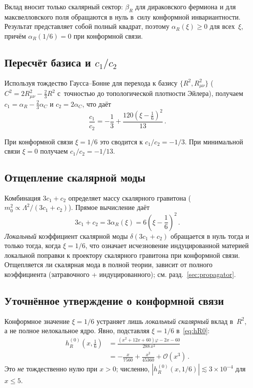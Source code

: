 \documentclass[aps,prd,twocolumn,superscriptaddress,nofootinbib,floatfix]{revtex4-2}
\theoremstyle{definition}
\theoremstyle{remark}
\begin{document}
Вклад вносит только скалярный сектор: $\beta_R$ для дираковского фермиона
и для максвелловского поля обращаются в нуль в~силу конформной инвариантности.
Результат представляет собой полный квадрат, поэтому
$\alpha_R(\xi) \geq 0$ для всех~$\xi$, причём $\alpha_R(1/6) = 0$ при
конформной связи.

\subsection{Пересчёт базиса и \texorpdfstring{$c_1/c_2$}{c1/c2}}

Используя тождество Гаусса--Бонне для перехода к базису
$\{R^2, R_{\mu\nu}^2\}$ ($C^2 = 2R_{\mu\nu}^2 - \frac{2}{3}R^2$
с~точностью до топологической плотности Эйлера), получаем
$c_1 = \alpha_R - \frac{2}{3}\alpha_C$ и $c_2 = 2\alpha_C$, что даёт
\begin{equation}
  \boxed{\frac{c_1}{c_2} = -\frac{1}{3}
    + \frac{120\!\left(\xi - \frac{1}{6}\right)^{\!2}}{13}\,.}
  \label{eq:c1c2}
\end{equation}

При конформной связи $\xi = 1/6$ это сводится к $c_1/c_2 = -1/3$. При
минимальной связи $\xi = 0$ получаем $c_1/c_2 = -1/13$.

\subsection{Отщепление скалярной моды}

Комбинация $3c_1 + c_2$ определяет массу скалярного гравитона
($m_0^2 \propto \Lambda^2/(3c_1 + c_2)$). Прямое вычисление даёт
\begin{equation}
  3c_1 + c_2 = 3\alpha_R(\xi) = 6\!\left(\xi - \frac{1}{6}\right)^{\!2}\,.
  \label{eq:3c1c2}
\end{equation}
\emph{Локальный} коэффициент скалярной моды $\delta(3c_1 + c_2)$
обращается в нуль тогда и только тогда, когда $\xi = 1/6$, что означает
исчезновение индуцированной материей локальной поправки к проектору
скалярного гравитона при конформной связи. Отщепляется ли скалярная мода
в полной теории, зависит от полного коэффициента (затравочного +
индуцированного); см. разд.~\ref{sec:propagator}.

\subsection{Уточнённое утверждение о конформной связи}

Конформное значение $\xi = 1/6$ устраняет лишь \emph{локальный скалярный}
вклад в~$R^2$, а не полное нелокальное ядро. Явно, подставляя
$\xi = 1/6$ в~\eqref{eq:hR0}:
\begin{align}
  h_R^{(0)}\!\left(x, \tfrac{1}{6}\right)
  &= \frac{(x^2 + 12x + 60)\varphi - 2x - 60}{288\,x^2}
  \nonumber\\
  &= -\frac{x}{7560} + \frac{x^2}{45360} + \mathcal{O}(x^3)\,.
  \label{eq:hR0-conformal}
\end{align}
Это \emph{не} тождественно нулю при $x > 0$; численно,
$|h_R^{(0)}(x, 1/6)| \lesssim 3 \times 10^{-4}$ для $x \leq 5$.
\end{document}
